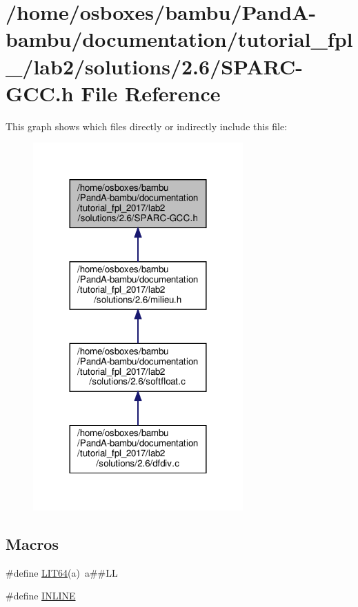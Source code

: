 \hypertarget{tutorial__fpl__2017_2lab2_2solutions_22_86_2SPARC-GCC_8h}{}\section{/home/osboxes/bambu/\+Pand\+A-\/bambu/documentation/tutorial\+\_\+fpl\+\_/lab2/solutions/2.6/\+S\+P\+A\+R\+C-\/\+G\+CC.h File Reference}
\label{tutorial__fpl__2017_2lab2_2solutions_22_86_2SPARC-GCC_8h}
This graph shows which files directly or indirectly include this file\+:
\nopagebreak
\begin{figure}[H]
\begin{center}
\leavevmode
\includegraphics[width=228pt]{df/d6a/tutorial__fpl__2017_2lab2_2solutions_22_86_2SPARC-GCC_8h__dep__incl}
\end{center}
\end{figure}
\subsection*{Macros}
\begin{DoxyCompactItemize}
\item 
\#define \hyperlink{tutorial__fpl__2017_2lab2_2solutions_22_86_2SPARC-GCC_8h_a575f5a619c8e7d71c338c70a2b4e25a5}{L\+I\+T64}(a)~a\#\#LL
\item 
\#define \hyperlink{tutorial__fpl__2017_2lab2_2solutions_22_86_2SPARC-GCC_8h_a2eb6f9e0395b47b8d5e3eeae4fe0c116}{I\+N\+L\+I\+NE}
\end{DoxyCompactItemize}

